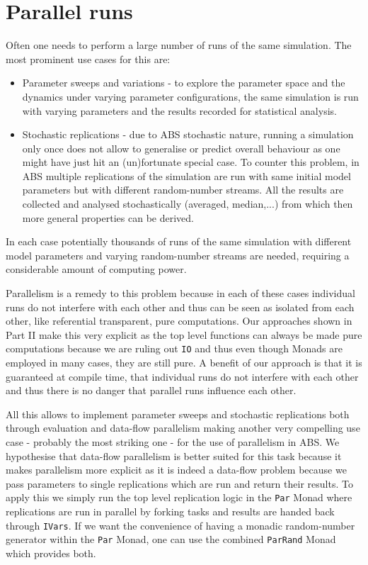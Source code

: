 \section{Parallel runs}
Often one needs to perform a large number of runs of the same simulation. The most prominent use cases for this are:

\begin{itemize}
	\item Parameter sweeps and variations - to explore the parameter space and the dynamics under varying parameter configurations, the same simulation is run with varying parameters and the results recorded for statistical analysis.
	
	\item Stochastic replications - due to ABS stochastic nature, running a simulation only once does not allow to generalise or predict overall behaviour as one might have just hit an (un)fortunate special case. To counter this problem, in ABS multiple replications of the  simulation are run with same initial model parameters but with different random-number streams. All the results are collected and analysed stochastically (averaged, median,...) from which then more general properties can be derived.
\end{itemize}

In each case potentially thousands of runs of the same simulation with different model parameters and varying random-number streams are needed, requiring a considerable amount of computing power.

Parallelism is a remedy to this problem because in each of these cases individual runs do not interfere with each other and thus can be seen as isolated from each other, like referential transparent, pure computations. Our approaches shown in Part II make this very explicit as the top level functions can always be made pure computations because we are ruling out \texttt{IO} and thus even though Monads are employed in many cases, they are still pure. A benefit of our approach is that it is guaranteed at compile time, that individual runs do not interfere with each other and thus there is no danger that parallel runs influence each other. 

All this allows to implement parameter sweeps and stochastic replications both through evaluation and data-flow parallelism making another very compelling use case - probably the most striking one - for the use of parallelism in ABS. We hypothesise that data-flow parallelism is better suited for this task because it makes parallelism more explicit as it is indeed a data-flow problem because we pass parameters to single replications which are run and return their results. To apply this we simply run the top level replication logic in the \texttt{Par} Monad where replications are run in parallel by forking tasks and results are handed back through \texttt{IVars}. If we want the convenience of having a monadic random-number generator within the \texttt{Par} Monad, one can use the combined \texttt{ParRand} Monad which provides both.